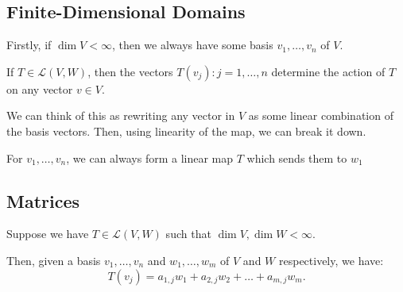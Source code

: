 \documentclass[openany]{book}
\begin{document}
\subsection{Finite-Dimensional Domains}
Firstly, if $\dim V < \infty$, then we always have some basis $v_{1}, \ldots, v_{n}$ of $V$.

If $T \in \mathcal L (V,W)$, then the vectors $T(v_{j}) : j = 1, \ldots, n$ determine the action of $T$ on any vector $v \in V$.

We can think of this as rewriting any vector in $V$ as some linear combination of the basis vectors. Then, using linearity of the map, we can break it down.

\begin{thm}
	For $v_{1}, \ldots, v_{n}$, we can always form a linear map $T$ which sends them to $w_{1}$
\end{thm}

\subsection{Matrices}
Suppose we have $T \in \mathcal L (V,W)$ such that $\dim V, \dim W < \infty$.

Then, given a basis $v_{1}, \ldots, v_{n}$ and $w_{1}, \ldots, w_{m}$ of $V$ and $W$ respectively, we have:
\begin{equation*}
	T(v_{j}) = a_{1,j}w_{1} + a_{2,j}w_{2} + \ldots + a_{m,j}w_{m}.
\end{equation*}
\end{document}
